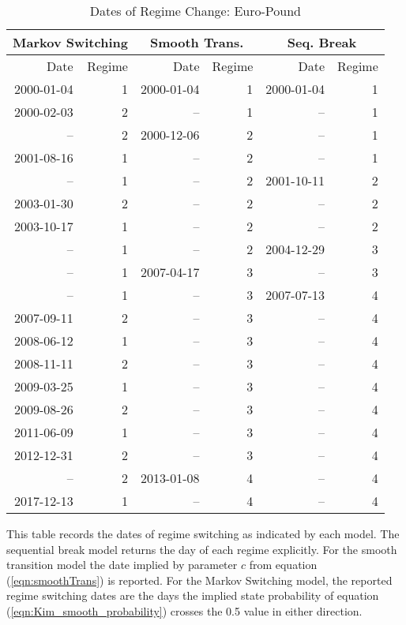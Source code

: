 \documentclass[12pt]{article}
\begin{document}
\begin{table}
	\centering
	\caption{Dates of Regime Change: Euro-Pound}
	\begin{tabular}[c]{r r | r r | r r}
		\midrule
		\multicolumn{2}{c}{Markov Switching} & \multicolumn{2}{c}{Smooth Trans.} & \multicolumn{2}{c}{Seq. Break} \\
		\midrule
		Date & Regime & Date & Regime & Date & Regime \\
		\midrule
		2000-01-04 &  1 & 2000-01-04 &  1 & 2000-01-04 &  1 \\
		2000-02-03 &  2 &         -- &  1 &         -- &  1 \\
		        -- &  2 & 2000-12-06 &  2 &         -- &  1 \\
		2001-08-16 &  1 &         -- &  2 &         -- &  1 \\
		        -- &  1 &         -- &  2 & 2001-10-11 &  2 \\
		2003-01-30 &  2 &         -- &  2 &         -- &  2 \\
		2003-10-17 &  1 &         -- &  2 &         -- &  2 \\
		        -- &  1 &         -- &  2 & 2004-12-29 &  3 \\
				-- &  1 & 2007-04-17 &  3 &         -- &  3 \\
		        -- &  1 &         -- &  3 & 2007-07-13 &  4 \\				
		2007-09-11 &  2 &         -- &  3 &         -- &  4 \\
		2008-06-12 &  1 &         -- &  3 &         -- &  4 \\
		2008-11-11 &  2 &         -- &  3 &         -- &  4 \\
		2009-03-25 &  1 &         -- &  3 &         -- &  4 \\
		2009-08-26 &  2 &         -- &  3 &         -- &  4 \\
		2011-06-09 &  1 &         -- &  3 &         -- &  4 \\
		2012-12-31 &  2 &         -- &  3 &         -- &  4 \\
		        -- &  2 & 2013-01-08 &  4 &         -- &  4 \\
		2017-12-13 &  1 &         -- &  4 &         -- &  4 \\
		\hline
	\end{tabular}
	\begin{tablenotes}
		\item{\footnotesize This table records the dates of regime switching as indicated by each model. The sequential break model returns the day of each regime explicitly. For the smooth transition model the date implied by parameter $c$ from equation (\ref{eqn:smoothTrans}) is reported. For the Markov Switching model, the reported regime switching dates are the days the implied state probability of equation (\ref{eqn:Kim_smooth_probability}) crosses the 0.5 value in either direction.}
	\end{tablenotes}
	\label{tbl:regime_changes_euro_pound}
\end{table}
\end{document}
